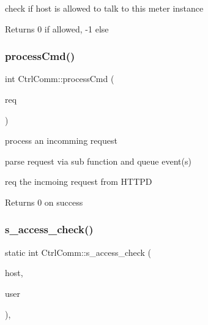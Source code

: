 check if host is allowed to talk to this meter instance 

\begin{DoxyReturn}{Returns}
0 if allowed, -\/1 else 
\end{DoxyReturn}
\mbox{\label{classCtrlComm_abb7de8cec0d6a04b1b722b25cb42ba5c}} 
\subsubsection{\texorpdfstring{process\+Cmd()}{processCmd()}}
{\footnotesize\ttfamily int Ctrl\+Comm\+::process\+Cmd (\begin{DoxyParamCaption}\item[{struct \hyperlink{structREQUEST}{R\+E\+Q\+U\+E\+ST} $\ast$}]{req }\end{DoxyParamCaption})}



process an incomming request 

parse request via sub function and queue event(s)

\begin{DoxyItemize}
\item {\ttfamily req} the incmoing request from H\+T\+T\+PD \begin{DoxyReturn}{Returns}
0 on success 
\end{DoxyReturn}
\end{DoxyItemize}
\mbox{\label{classCtrlComm_a240b7eae0b93c38199b860693bfdee07}} 
\subsubsection{\texorpdfstring{s\+\_\+access\+\_\+check()}{s\_access\_check()}}
{\footnotesize\ttfamily static int Ctrl\+Comm\+::s\+\_\+access\+\_\+check (\begin{DoxyParamCaption}\item[{char $\ast$}]{host,  }\item[{char $\ast$}]{user }\end{DoxyParamCaption})\hspace{0.3cm}{\ttfamily [inline]}, {\ttfamily [static]}}



